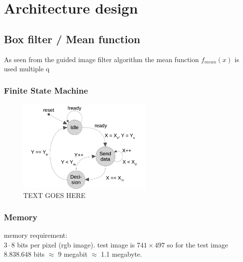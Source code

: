 \chapter{Architecture design}

\section{Box filter / Mean function}
As seen from the guided image filter algorithm the mean function $f_{mean}(x)$ is used multiple q

\subsection{Finite State Machine}

\begin{figure}
  \centering
  \includegraphics[width=0.6\textwidth]{figures/meanFSMv1.jpg}
  \caption{TEXT GOES HERE}
  \label{fig:LABEL}
\end{figure}

\subsection{Memory}

memory requirement: \\
$3 \cdot 8$ bits per pixel (rgb image). test image is $741 \times 497$ so for the test image $8.838.648$ bits $\approx$ 9 megabit $\approx$ 1.1 megabyte.
